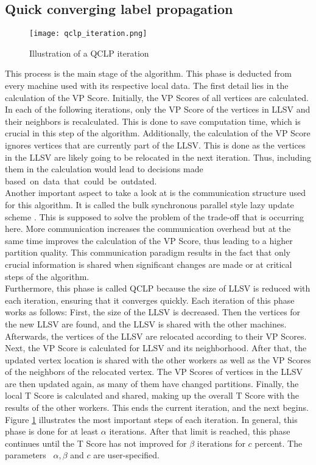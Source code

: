 \documentclass[acmsmall,nonacm,screen,review]{acmart}
\begin{document}
\subsection{Quick converging label propagation}
\begin{figure}[b]
\centering
\caption{Illustration of a QCLP iteration}
\label{iteration}
\texttt{[image: qclp\_iteration.png]}
\end{figure}
This process is the main stage of the algorithm. This phase is deducted from every machine used with its respective local data. The first detail lies in the calculation of the VP Score. Initially, the VP Scores of all vertices are calculated. In each of the following iterations, only the VP Score of the vertices in LLSV and their neighbors is recalculated. This is done to save computation time, which is crucial in this step of the algorithm. Additionally, the calculation of the VP Score ignores vertices that are currently part of the LLSV. This is done as the vertices in the LLSV are likely going to be relocated in the next iteration. Thus, including them in the calculation would lead to decisions made \hbox{based on data that could be outdated.} 
\\
Another important aspect to take a look at is the communication structure used for this algorithm. It is called the bulk synchronous parallel style lazy update scheme \cite{BSP}. This is supposed to solve the problem of the trade-off that is occurring here. More communication increases the communication overhead but at the same time improves the calculation of the VP Score, thus leading to a higher partition quality. This communication paradigm  results in the fact that only crucial information is shared when significant changes are made or at critical steps of the algorithm. \\
Furthermore, this phase is called QCLP because the size of LLSV is reduced with each iteration, ensuring that it converges quickly. Each iteration of this phase works as follows: First, the size of the LLSV is decreased. Then the vertices for the new LLSV are found, and the LLSV is shared with the other machines. Afterwards, the vertices of the LLSV are relocated according to their VP Scores. Next, the VP Score is calculated for LLSV and its neighborhood. After that, the updated vertex location is shared with the other workers as well as the VP Scores of the neighbors of the relocated vertex. The VP Scores of vertices in the LLSV are then updated again, as many of them have changed partitions. Finally, the local T Score is calculated and shared, making up the overall T Score with the results of the other workers. This ends the current iteration, and the next begins. Figure \ref{iteration} illustrates the most important steps of each iteration. In general, this phase is done for at least $\alpha$ iterations. After that limit is reached, this phase continues until the T Score has not improved for $\beta$ iterations for $c$ percent. The parameters ~$\alpha,\beta$ and $c$ are user-specified. \\
\end{document}
